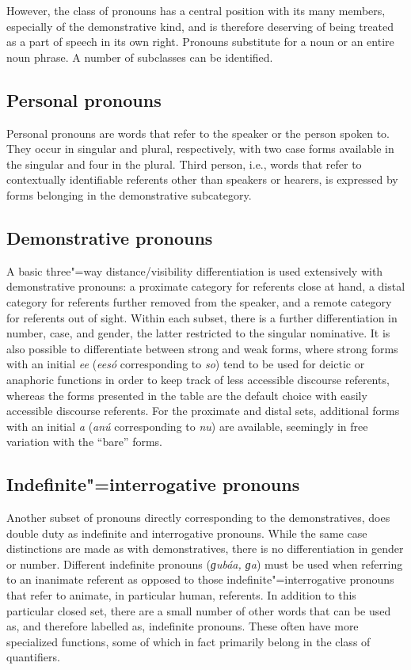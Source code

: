 However, the class of pronouns has a central position with its many members, especially of the demonstrative kind, and is therefore deserving of being treated as a part of speech in its own right. Pronouns substitute for a noun or an entire noun phrase. A number of subclasses can be identified.


\subsection{Personal pronouns}
\label{subsec:3b-6-1}
Personal pronouns are words that refer to the speaker or the person spoken to. They occur in singular and plural, respectively, with two case forms available in the singular and four in the plural. Third person, i.e., words that refer to contextually identifiable referents other than speakers or hearers, is expressed by forms belonging in the demonstrative subcategory.


\subsection{Demonstrative pronouns}
\label{subsec:3b-6-2}
A basic three"=way distance/visibility differentiation is used extensively with demonstrative pronouns: a proximate category for referents close at hand, a distal category for referents further removed from the speaker, and a remote category for referents out of sight. Within each subset, there is a further differentiation in number, case, and gender, the latter restricted to the singular nominative. It is also possible to differentiate between strong and weak forms, where strong forms with an initial \textit{ee} (\textit{eesó} corresponding to \textit{so}) tend to be used for deictic or anaphoric functions in order to keep track of less accessible discourse referents, whereas the forms presented in the table are the default choice with easily accessible discourse referents. For the proximate and distal sets, additional forms with an initial \textit{a} (\textit{anú} corresponding to \textit{nu}) are available, seemingly in free variation with the ``bare'' forms.


\subsection{Indefinite"=interrogative pronouns}
\label{subsec:3b-6-3}
Another subset of pronouns directly corresponding to the demonstratives, does double duty as indefinite and interrogative pronouns. While the same case distinctions are made as with demonstratives, there is no differentiation in gender or number. Different indefinite pronouns (\textit{ɡubáa, ɡa}) must be used when referring to an inanimate referent as opposed to those indefinite"=interrogative pronouns that refer to animate, in particular human, referents. In addition to this particular closed set, there are a small number of other words that can be used as, and therefore labelled as, indefinite pronouns. These often have more specialized functions, some of which in fact primarily belong in the class of quantifiers.


